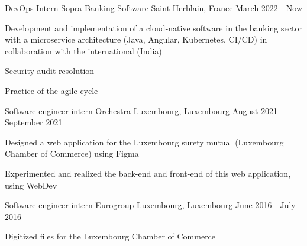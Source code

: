 
\begin{cventries}
  \cventry
    {DevOps Intern} %
    {Sopra Banking Software} %
    {Saint-Herblain, France} %
    {March 2022 - Now} %
    {
      \begin{cvitems} %
        \item {Development and implementation of a cloud-native software in the banking sector with a microservice architecture (Java, Angular, Kubernetes, CI/CD) in collaboration with the international (India)}
        \item {Security audit resolution}
        \item {Practice of the agile cycle}
      \end{cvitems}
    }
    
  \cventry
    {Software engineer intern} %
    {Orchestra} %
    {Luxembourg, Luxembourg} %
    {August 2021 - September 2021} %
    {
      \begin{cvitems} %
        \item {Designed a web application for the Luxembourg surety mutual (Luxembourg Chamber of Commerce) using Figma}
        \item {Experimented and realized the back-end and front-end of this web application, using WebDev}
      \end{cvitems}
    }

  \cventry
    {Software engineer intern} %
    {Eurogroup} %
    {Luxembourg, Luxembourg} %
    {June 2016 - July 2016} %
    {
      \begin{cvitems} %
        \item {Digitized files for the Luxembourg Chamber of Commerce}
      \end{cvitems}
    }

\end{cventries}
